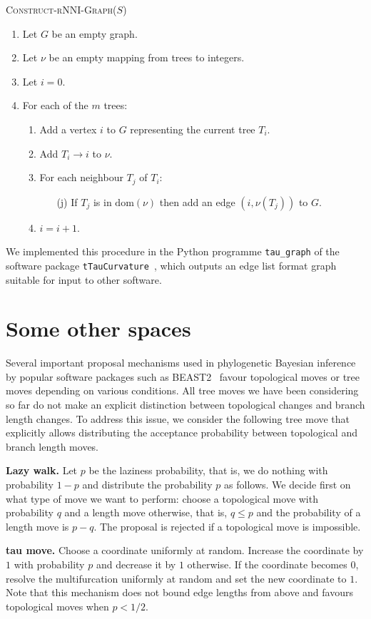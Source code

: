 \documentclass{amsart}
\newcommand{\rnni}{\mathrm{rNNI}}
\newcommand{\dom}{\mathrm{dom}}
\begin{document}
\textsc{Construct-$\rnni$-Graph($S$)}
\begin{enumerate}[1.]
	\item Let $G$ be an empty graph.
	\item Let $\nu$ be an empty mapping from trees to integers.
	\item Let $i = 0$.
	\item For each of the $m$ trees: \vspace{-0.2em}
		\begin{enumerate}
			\item Add a vertex $i$ to $G$ representing the current tree $T_i$.
			\item Add $T_i \rightarrow i$ to $\nu$.
			\item For each neighbour $T_j$ of $T_i$:
				\begin{enumerate}
					\item[(j)] If $T_j$ is in $\dom(\nu)$ then add an edge $(i, \nu(T_j))$ to $G$.
				\end{enumerate}
		\item $i = i + 1$.
		\end{enumerate}
\end{enumerate}

We implemented this procedure in the Python programme \texttt{tau\_graph}
of the software package \texttt{tTauCurvature}~\cite{tTauCurvature},
which outputs an edge list format graph suitable for input to other software.

\section{Some other spaces}

Several important proposal mechanisms used in phylogenetic Bayesian inference by popular software packages such as BEAST2~\cite{beast2} favour topological moves or tree moves depending on various conditions.
All tree moves we have been considering so far do not make an explicit distinction between topological changes and branch length changes.
To address this issue, we consider the following tree move that explicitly allows distributing the acceptance probability between topological and branch length moves.

{\bf Lazy walk.}
Let $p$ be the laziness probability, that is, we do nothing with probability $1-p$ and distribute the probability $p$ as follows.
We decide first on what type of move we want to perform: choose a topological move with probability $q$ and a length move otherwise, that is, $q \leq p$ and the probability of a length move is $p-q$.
The proposal is rejected if a topological move is impossible.

{\bf tau move.}
Choose a coordinate uniformly at random.
Increase the coordinate by $1$ with probability $p$ and decrease it by $1$ otherwise.
If the coordinate becomes $0$, resolve the multifurcation uniformly at random and set the new coordinate to $1$.
Note that this mechanism does not bound edge lengths from above and favours topological moves when $p<1/2$.



\end{document}
